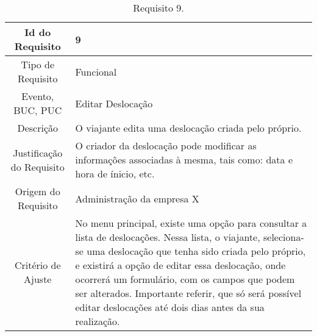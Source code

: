 \begin{table}[H]
\begin{center}
  \begin{tabularx}{\textwidth}{ | c | X | }
    \hline
    Id do Requisito & 9  \\
    
    \hline
    Tipo de Requisito & Funcional \\
    
    \hline
    Evento, BUC, PUC &  Editar Deslocação\\
    
    \hline
    Descrição & O viajante edita uma deslocação criada pelo próprio. \\
    
    \hline
    Justificação do Requisito & O criador da deslocação pode modificar as informações associadas à mesma, tais como: data e hora de ínicio, etc.\\
    
    \hline
    Origem do Requisito & Administração da empresa X \\
    
    \hline
    Critério de Ajuste & No menu principal, existe uma opção para consultar a lista de deslocações. Nessa lista, o viajante, seleciona-se uma deslocação que tenha sido criada pelo próprio, e existirá a opção de editar essa deslocação, onde ocorrerá um formulário, com os campos que podem ser alterados. Importante referir, que só será possível editar deslocações até dois dias antes da sua realização.\\
    
    \hline
  \end{tabularx}
  \caption{Requisito 9.} \label{tab:r3}
\end{center}
\end{table}

